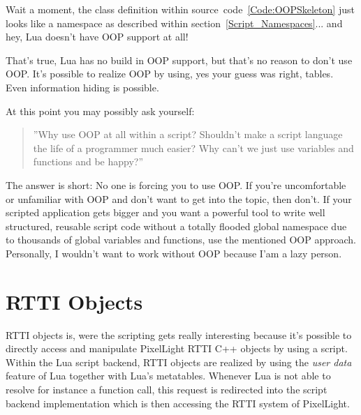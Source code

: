 Wait a moment, the class definition within source~code~\ref{Code:OOPSkeleton} just looks like a namespace as described within section~\ref{Script_Namespaces}... and hey, Lua doesn't have \ac{OOP} support at all!

That's true, Lua has no build in \ac{OOP} support, but that's no reason to don't use \ac{OOP}. It's possible to realize \ac{OOP} by using, yes your guess was right, tables. Even information hiding is possible.

At this point you may possibly ask yourself: \begin{quote}''Why use \ac{OOP} at all within a script? Shouldn't make a script language the life of a programmer much easier? Why can't we just use variables and functions and be happy?''\end{quote} The answer is short: No one is forcing you to use \ac{OOP}. If you're uncomfortable or unfamiliar with \ac{OOP} and don't want to get into the topic, then don't. If your scripted application gets bigger and you want a powerful tool to write well structured, reusable script code without a totally flooded global namespace due to thousands of global variables and functions, use the mentioned \ac{OOP} approach. Personally, I wouldn't want to work without \ac{OOP} because I'am a lazy person.




\section{\ac{RTTI} Objects}
\label{Script_RTTIObjects}
\ac{RTTI} objects is, were the scripting gets really interesting because it's possible to directly access and manipulate PixelLight \ac{RTTI} C++ objects by using a script. Within the Lua script backend, \ac{RTTI} objects are realized by using the \emph{user data} feature of Lua together with Lua's metatables. Whenever Lua is not able to resolve for instance a function call, this request is redirected into the script backend implementation which is then accessing the \ac{RTTI} system of PixelLight.

